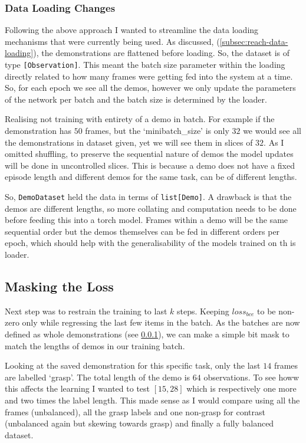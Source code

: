 \subsubsection{Data Loading Changes}\label{subsec:grasp-data-loading-changes}
Following the above approach I wanted to streamline the data loading mechanisms that were currently being used. As discussed, (\ref{subsec:reach-data-loading}), the demonstrations are flattened before loading. So, the dataset is of type \verb|[Observation]|. This meant the batch size parameter within the loading directly related to how many frames were getting fed into the system at a time. So, for each epoch we see all the demos, however we only update the parameters of the network per batch and the batch size is determined by the loader.

Realising not training with entirety of a demo in batch. For example if the demonstration has $50$ frames, but the `minibatch\_size' is only $32$ we would see all the demonstrations in dataset given, yet we will see them in slices of $32$. As I omitted shuffling, to preserve the sequential nature of demos the model updates will be done in uncontrolled slices. This is because a demo does not have a fixed episode length and different demos for the same task, can be of different lengths.

So, \verb|DemoDataset| held the data in terms of \verb|list[Demo]|. A drawback is that the demos are different lengths, so more collating and computation needs to be done before feeding this into a torch model. Frames within a demo will be the same sequential order but the demos themselves can be fed in different orders per epoch, which should help with the generalisability of the models trained on th is loader.

\subsection{Masking the Loss}
Next step was to restrain the training to last $k$ steps. Keeping $loss_{bce}$ to be non-zero only while regressing the last few items in the batch. As the batches are now defined as whole demonstrations (see \ref{subsec:grasp-data-loading-changes}), we can make a simple bit mask to match the lengths of demos in our training batch.

Looking at the saved demonstration for this specific task, only the last $14$ frames are labelled `grasp'. The total length of the demo is $64$ observations. To see howw this affects the learning I wanted to test \(\left[15, 28\right]\) which is respectively one more and two times the label length. This made sense as I would compare using all the frames (unbalanced), all the grasp labels and one non-grasp for contrast (unbalanced again but skewing towards grasp) and finally a fully balanced dataset.

